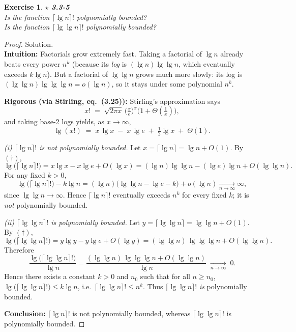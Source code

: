 \documentclass[12pt]{article}
\newtheorem{exercise}[theorem]{Exercise}
\theoremstyle{definition}
\begin{document}
\newpage

\begin{exercise}
\noindent
\textbf{$\star$ 3.3-5} \\
Is the function $\lceil \lg n \rceil !$ polynomially bounded? \\
Is the function $\lceil \lg \lg n \rceil !$ polynomially bounded?
\end{exercise}

\begin{proof}
Solution. \\

\noindent
\textbf{Intuition:}
Factorials grow extremely fast. Taking a factorial of $\lg n$ already beats every power $n^k$
(because its \emph{log} is $(\lg n)\lg\lg n$, which eventually exceeds $k\lg n$).
But a factorial of $\lg\lg n$ grows much more slowly: its log is
$(\lg\lg n)\lg\lg\lg n=o(\lg n)$, so it stays under some polynomial $n^k$.

\noindent
\textbf{Rigorous (via Stirling, eq.\ (3.25)):}
Stirling’s approximation says
\[
x! \;=\; \sqrt{2\pi x}\,\Big(\tfrac{x}{e}\Big)^x\Big(1+\Theta(\tfrac{1}{x})\Big),
\]
and taking base-2 logs yields, as $x\to\infty$,
\[
\lg(x!) \;=\; x\,\lg x \;-\; x\,\lg e \;+\; \tfrac12\lg x \;+\; \Theta(1).
\tag{$\dagger$}
\]

\emph{(i) $\lceil \lg n \rceil !$ is not polynomially bounded.}
Let $x=\lceil \lg n \rceil = \lg n + O(1)$. By $(\dagger)$,
\[
\lg\big(\lceil \lg n \rceil !\big)
= x\lg x - x\lg e + O(\lg x)
= (\lg n)\lg\lg n - (\lg e)\lg n + O(\lg\lg n).
\]
For any fixed $k>0$,
\[
\lg\big(\lceil \lg n \rceil !\big) - k\lg n
= (\lg n)\big(\lg\lg n - \lg e - k\big) + o(\lg n)\xrightarrow[n\to\infty]{}\infty,
\]
since $\lg\lg n\to\infty$. Hence $\lceil \lg n \rceil !$ eventually exceeds $n^k$
for every fixed $k$; it is \emph{not} polynomially bounded.

\emph{(ii) $\lceil \lg\lg n \rceil !$ is polynomially bounded.}
Let $y=\lceil \lg\lg n \rceil = \lg\lg n + O(1)$. By $(\dagger)$,
\[
\lg\big(\lceil \lg\lg n \rceil !\big)
= y\lg y - y\lg e + O(\lg y)
= (\lg\lg n)\,\lg\lg\lg n + O(\lg\lg n).
\]
Therefore
\[
\frac{\lg\big(\lceil \lg\lg n \rceil !\big)}{\lg n}
= \frac{(\lg\lg n)\,\lg\lg\lg n + O(\lg\lg n)}{\lg n}
\;\xrightarrow[n\to\infty]{}\;0.
\]
Hence there exists a constant $k>0$ and $n_0$ such that for all $n\ge n_0$,
$\lg\big(\lceil \lg\lg n \rceil !\big)\le k\lg n$, i.e.\ $\lceil \lg\lg n \rceil !\le n^k$.
Thus $\lceil \lg\lg n \rceil !$ \emph{is} polynomially bounded.

\medskip
\noindent
\textbf{Conclusion:}
$\lceil \lg n \rceil !$ is not polynomially bounded, whereas $\lceil \lg\lg n \rceil !$ is polynomially bounded.
\end{proof}
\end{document}

